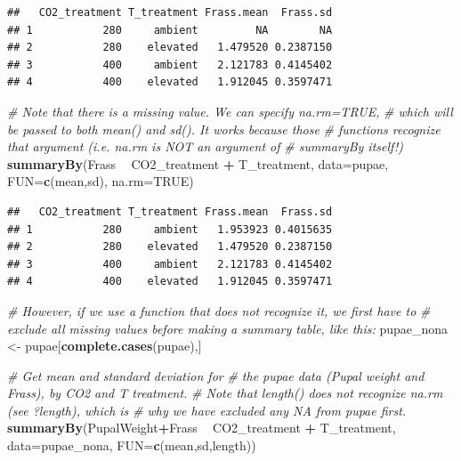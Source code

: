 \documentclass[]{book}
\newenvironment{Shaded}{\begin{snugshade}}{\end{snugshade}}
\newcommand{\CommentTok}[1]{\textcolor[rgb]{0.56,0.35,0.01}{\textit{#1}}}
\newcommand{\DataTypeTok}[1]{\textcolor[rgb]{0.13,0.29,0.53}{#1}}
\newcommand{\KeywordTok}[1]{\textcolor[rgb]{0.13,0.29,0.53}{\textbf{#1}}}
\newcommand{\NormalTok}[1]{#1}
\newcommand{\OperatorTok}[1]{\textcolor[rgb]{0.81,0.36,0.00}{\textbf{#1}}}
\newcommand{\OtherTok}[1]{\textcolor[rgb]{0.56,0.35,0.01}{#1}}
\newcommand{\StringTok}[1]{\textcolor[rgb]{0.31,0.60,0.02}{#1}}
\begin{document}
\begin{verbatim}
##   CO2_treatment T_treatment Frass.mean  Frass.sd
## 1           280     ambient         NA        NA
## 2           280    elevated   1.479520 0.2387150
## 3           400     ambient   2.121783 0.4145402
## 4           400    elevated   1.912045 0.3597471
\end{verbatim}

\begin{Shaded}
\begin{Highlighting}[]
\CommentTok{# Note that there is a missing value. We can specify na.rm=TRUE,}
\CommentTok{# which will be passed to both mean() and sd(). It works because those}
\CommentTok{# functions recognize that argument (i.e. na.rm is NOT an argument of }
\CommentTok{# summaryBy itself!)}
\KeywordTok{summaryBy}\NormalTok{(Frass }\OperatorTok{~}\StringTok{ }\NormalTok{CO2_treatment }\OperatorTok{+}\StringTok{ }\NormalTok{T_treatment,}
          \DataTypeTok{data=}\NormalTok{pupae, }\DataTypeTok{FUN=}\KeywordTok{c}\NormalTok{(mean,sd), }\DataTypeTok{na.rm=}\OtherTok{TRUE}\NormalTok{)}
\end{Highlighting}
\end{Shaded}

\begin{verbatim}
##   CO2_treatment T_treatment Frass.mean  Frass.sd
## 1           280     ambient   1.953923 0.4015635
## 2           280    elevated   1.479520 0.2387150
## 3           400     ambient   2.121783 0.4145402
## 4           400    elevated   1.912045 0.3597471
\end{verbatim}

\begin{Shaded}
\begin{Highlighting}[]
\CommentTok{# However, if we use a function that does not recognize it, we first have to}
\CommentTok{# exclude all missing values before making a summary table, like this:}
\NormalTok{pupae_nona <-}\StringTok{ }\NormalTok{pupae[}\KeywordTok{complete.cases}\NormalTok{(pupae),]}

\CommentTok{# Get mean and standard deviation for}
\CommentTok{# the pupae data (Pupal weight and Frass), by CO2 and T treatment.}
\CommentTok{# Note that length() does not recognize na.rm (see ?length), which is}
\CommentTok{# why we have excluded any NA from pupae first.}
\KeywordTok{summaryBy}\NormalTok{(PupalWeight}\OperatorTok{+}\NormalTok{Frass }\OperatorTok{~}\StringTok{ }\NormalTok{CO2_treatment }\OperatorTok{+}\StringTok{ }\NormalTok{T_treatment,}
          \DataTypeTok{data=}\NormalTok{pupae_nona,}
          \DataTypeTok{FUN=}\KeywordTok{c}\NormalTok{(mean,sd,length))}
\end{Highlighting}
\end{Shaded}
\end{document}
